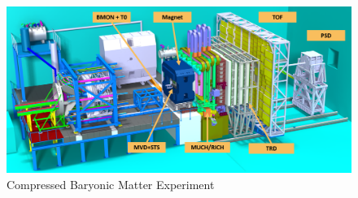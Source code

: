 \begin{figure}[!h]
    \centering
    \includegraphics[width=0.95\columnwidth]{Chapter3/Irradiation/images/CBMnew.png}
    \caption{Compressed Baryonic Matter Experiment}
    \label{fig:exp}
\end{figure}